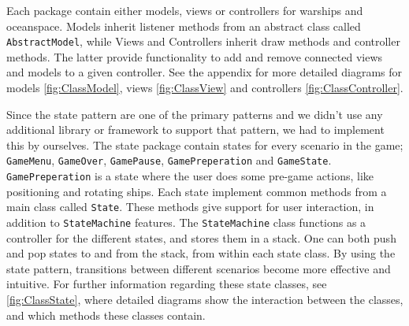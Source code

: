Each package contain either models, views or controllers for warships and oceanspace. Models inherit listener methods from an abstract class called \texttt{AbstractModel}, while Views and Controllers inherit draw methods and controller methods. The latter provide functionality to add and remove connected views and models to a given controller. See the appendix for more detailed diagrams for models \ref{fig:ClassModel}, views \ref{fig:ClassView} and controllers \ref{fig:ClassController}.

Since the state pattern are one of the primary patterns and we didn't use any additional library or framework to support that pattern, we had to implement this by ourselves. The state package contain states for every scenario in the game; \texttt{GameMenu}, \texttt{GameOver}, \texttt{GamePause}, \texttt{GamePreperation} and \texttt{GameState}. \texttt{GamePreperation} is a state where the user does some pre-game actions, like positioning and rotating ships. Each state implement common methods from a main class called \texttt{State}. These methods give support for user interaction, in addition to \texttt{StateMachine} features. The \texttt{StateMachine} class functions as a controller for the different states, and stores them in a stack. One can both push and pop states to and from the stack, from within each state class. By using the state pattern, transitions between different scenarios become more effective and intuitive. For further information regarding these state classes, see \ref{fig:ClassState}, where detailed diagrams show the interaction between the classes, and which methods these classes contain.

